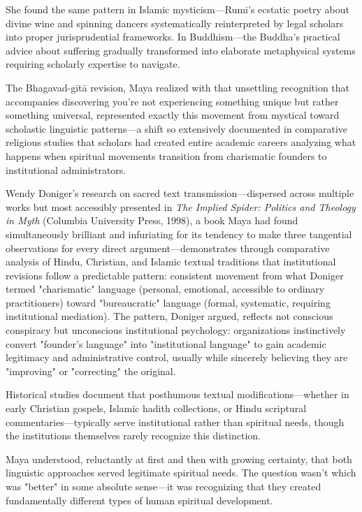 \documentclass[12pt,twoside]{book}
\begin{document}
She found the same pattern in Islamic mysticism—Rumi's ecstatic poetry about divine wine and spinning dancers systematically reinterpreted by legal scholars into proper jurisprudential frameworks. In Buddhism—the Buddha's practical advice about suffering gradually transformed into elaborate metaphysical systems requiring scholarly expertise to navigate.

The Bhagavad-gītā revision, Maya realized with that unsettling recognition that accompanies discovering you're not experiencing something unique but rather something universal, represented exactly this movement from mystical toward scholastic linguistic patterns—a shift so extensively documented in comparative religious studies that scholars had created entire academic careers analyzing what happens when spiritual movements transition from charismatic founders to institutional administrators.

Wendy Doniger's research on sacred text transmission—dispersed across multiple works but most accessibly presented in \emph{The Implied Spider: Politics and Theology in Myth} (Columbia University Press, 1998), a book Maya had found simultaneously brilliant and infuriating for its tendency to make three tangential observations for every direct argument—demonstrates through comparative analysis of Hindu, Christian, and Islamic textual traditions that institutional revisions follow a predictable pattern: consistent movement from what Doniger termed "charismatic" language (personal, emotional, accessible to ordinary practitioners) toward "bureaucratic" language (formal, systematic, requiring institutional mediation). The pattern, Doniger argued, reflects not conscious conspiracy but unconscious institutional psychology: organizations instinctively convert "founder's language" into "institutional language" to gain academic legitimacy and administrative control, usually while sincerely believing they are "improving" or "correcting" the original.

Historical studies document that posthumous textual modifications—whether in early Christian gospels, Islamic hadith collections, or Hindu scriptural commentaries—typically serve institutional rather than spiritual needs, though the institutions themselves rarely recognize this distinction.

Maya understood, reluctantly at first and then with growing certainty, that both linguistic approaches served legitimate spiritual needs. The question wasn't which was "better" in some absolute sense—it was recognizing that they created fundamentally different types of human spiritual development.
\end{document}

